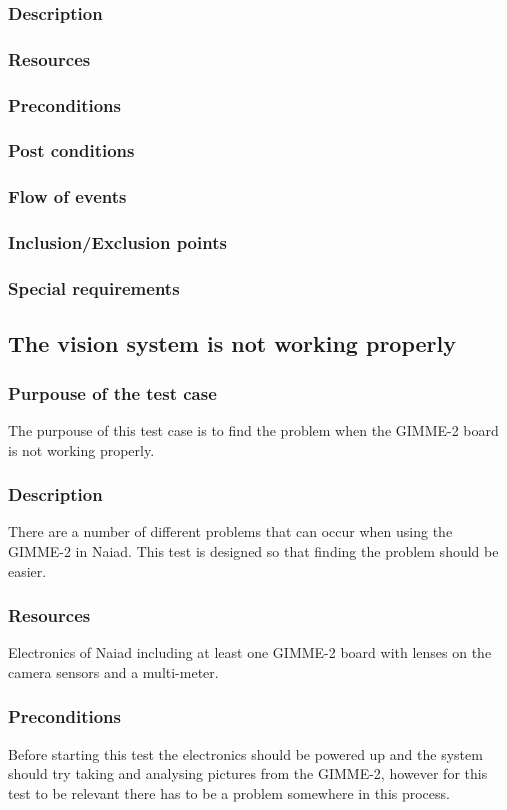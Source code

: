 \documentclass[10pt,a4paper]{article}
\begin{document}
\subsubsection*{Description}
\subsubsection*{Resources}
\subsubsection*{Preconditions}
\subsubsection*{Post conditions}
\subsubsection*{Flow of events}
\subsubsection*{Inclusion/Exclusion points}
\subsubsection*{Special requirements}

\subsection{The vision system is not working properly}
\subsubsection*{Purpouse of the test case}
The purpouse of this test case is to find the problem when the GIMME-2 board is not working properly. 
\subsubsection*{Description}
There are a number of different problems that can occur when using the GIMME-2 in Naiad. This test is designed so that finding the problem should be easier.
\subsubsection*{Resources}
Electronics of Naiad including at least one GIMME-2 board with lenses on the camera sensors and a multi-meter. 
\subsubsection*{Preconditions}
Before starting this test the electronics should be powered up and the system should try taking and analysing pictures from the GIMME-2, however for this test to be relevant there has to be a problem somewhere in this process. 
\end{document}
